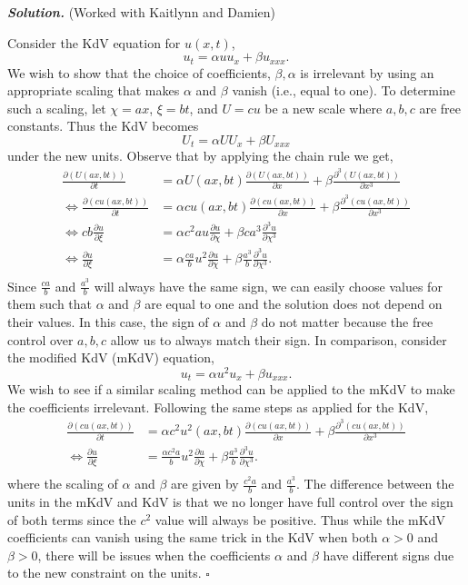 \documentclass[12pt]{report}
\newenvironment{solution}[1][\it{Solution}]{\textbf{#1. } }{$\square$}
\def\p{{\partial}}
\begin{document}
\begin{solution}
    (Worked with Kaitlynn and Damien)

    \noindent
    Consider the KdV equation for $u(x,t)$,
    $$u_t = \alpha uu_x + \beta u_{xxx}.$$
    We wish to show that the choice of coefficients, $\beta,\alpha$ is irrelevant by using an appropriate scaling that makes $\alpha$ and $\beta$ vanish (i.e., equal to one).
    To determine such a scaling, let $\chi = ax$, $\xi = bt$, and $U = cu$ be a new scale where $a,b,c$ are free constants. 
    Thus the KdV becomes $$U_t = \alpha U U_x + \beta U_{xxx}$$ under the new units.
    Observe that by applying the chain rule we get,
    \begin{align*}
        \frac{\p(U(ax,bt))}{\p t} &= \alpha U(ax,bt)\frac{\p(U(ax,bt))}{\p x} + \beta \frac{\p^3(U(ax,bt))}{\p x^3}\\
        \Leftrightarrow \frac{\p(cu(ax,bt))}{\p t} &= \alpha cu(ax,bt)\frac{\p(cu(ax,bt))}{\p x} + \beta \frac{\p^3(cu(ax,bt))}{\p x^3}\\
        \Leftrightarrow cb\frac{\p u}{\p \xi} &= \alpha c^2 a u\frac{\p u}{\p \chi} + \beta c a^3\frac{\p^3 u}{\p \chi^3}\\
        \Leftrightarrow \frac{\p u}{\p \xi} &=  \alpha\frac{ ca}{b}u^2\frac{\p u}{\p \chi} + \beta \frac{a^3}{b}\frac{\p^3 u}{\p \chi^3}.\\
    \end{align*}
    Since $\frac{c a}{b}$ and $\frac{a^3}{b}$ will always have the same sign, we can easily choose values for them such that $\alpha$ and $\beta$ are equal to one and the solution does not depend on their values.
    In this case, the sign of $\alpha$ and $\beta$ do not matter because the free control over $a,b,c$ allow us to always match their sign.  
    In comparison, consider the modified KdV (mKdV) equation,
    $$u_t = \alpha u^2u_x + \beta u_{xxx}.$$    
    We wish to see if a similar scaling method can be applied to the mKdV to make the coefficients irrelevant.
    Following the same steps as applied for the KdV,
    \begin{align*}
        \frac{\p(cu(ax,bt))}{\p t} &= \alpha c^2u^2(ax,bt)\frac{\p(cu(ax,bt))}{\p x} + \beta \frac{\p^3(cu(ax,bt))}{\p x^3}\\
        \Leftrightarrow \frac{\p u}{\p \xi} &=  \frac{\alpha c^2a}{b}u^2\frac{\p u}{\p \chi} + \beta \frac{a^3}{b}\frac{\p^3 u}{\p \chi^3}.\\
    \end{align*} 
    where the scaling of $\alpha$ and $\beta$ are given by $\frac{c^2a}{b}$ and $\frac{a^3}{b}$.
    The difference between the units in the mKdV and KdV is that we no longer have full control over the sign of both terms since the $c^2$ value will always be positive.
    Thus while the mKdV coefficients can vanish using the same trick in the KdV when both $\alpha > 0$ and $\beta > 0$, there will be issues when the coefficients $\alpha$ and $\beta$ have different signs due to the new constraint on the units. 
\end{solution}
\end{document}
